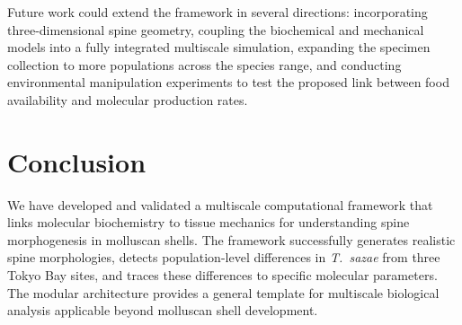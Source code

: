 \documentclass[11pt]{article}
\begin{document}
Future work could extend the framework in several directions: incorporating three-dimensional spine geometry, coupling the biochemical and mechanical models into a fully integrated multiscale simulation, expanding the specimen collection to more populations across the species range, and conducting environmental manipulation experiments to test the proposed link between food availability and molecular production rates.

\section{Conclusion}

We have developed and validated a multiscale computational framework that links molecular biochemistry to tissue mechanics for understanding spine morphogenesis in molluscan shells. The framework successfully generates realistic spine morphologies, detects population-level differences in \textit{T.\ sazae} from three Tokyo Bay sites, and traces these differences to specific molecular parameters. The modular architecture provides a general template for multiscale biological analysis applicable beyond molluscan shell development.



\end{document}

